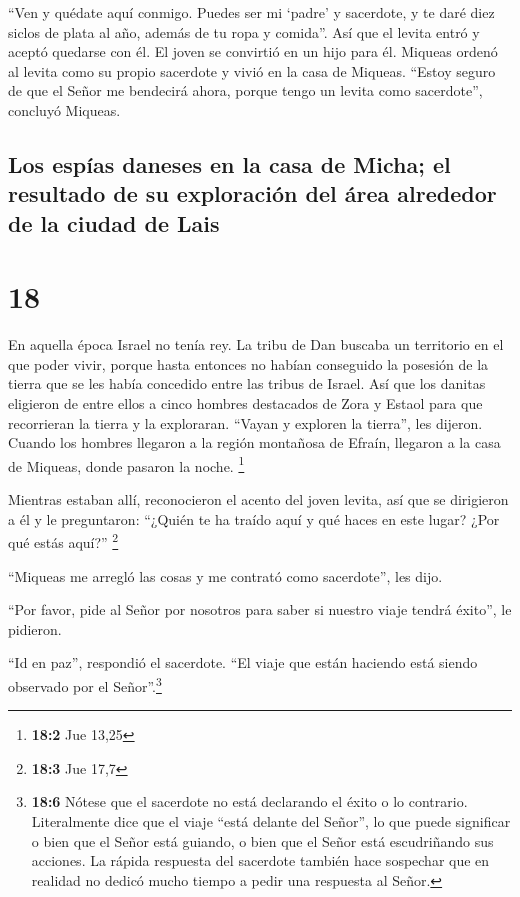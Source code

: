  ``Ven y quédate aquí conmigo. Puedes ser mi `padre' y
sacerdote, y te daré diez siclos de plata al año, además de tu ropa y
comida''. Así que el levita entró  y aceptó quedarse con
él. El joven se convirtió en un hijo para él.  Miqueas
ordenó al levita como su propio sacerdote y vivió en la casa de Miqueas.
 ``Estoy seguro de que el Señor me bendecirá ahora,
porque tengo un levita como sacerdote'', concluyó Miqueas.

\hypertarget{los-espuxedas-daneses-en-la-casa-de-micha-el-resultado-de-su-exploraciuxf3n-del-uxe1rea-alrededor-de-la-ciudad-de-lais}{%
\subsection{Los espías daneses en la casa de Micha; el resultado de su
exploración del área alrededor de la ciudad de
Lais}\label{los-espuxedas-daneses-en-la-casa-de-micha-el-resultado-de-su-exploraciuxf3n-del-uxe1rea-alrededor-de-la-ciudad-de-lais}}

\hypertarget{section-17}{%
\section{18}\label{section-17}}

 En aquella época Israel no tenía rey. La tribu de Dan
buscaba un territorio en el que poder vivir, porque hasta entonces no
habían conseguido la posesión de la tierra que se les había concedido
entre las tribus de Israel.  Así que los danitas eligieron
de entre ellos a cinco hombres destacados de Zora y Estaol para que
recorrieran la tierra y la exploraran. ``Vayan y exploren la tierra'',
les dijeron. Cuando los hombres llegaron a la región montañosa de
Efraín, llegaron a la casa de Miqueas, donde pasaron la noche.
\footnote{\textbf{18:2} Jue 13,25}

 Mientras estaban allí, reconocieron el acento del joven
levita, así que se dirigieron a él y le preguntaron: ``¿Quién te ha
traído aquí y qué haces en este lugar? ¿Por qué estás aquí?''
\footnote{\textbf{18:3} Jue 17,7}

 ``Miqueas me arregló las cosas y me contrató como
sacerdote'', les dijo.

 ``Por favor, pide al Señor por nosotros para saber si
nuestro viaje tendrá éxito'', le pidieron.

 ``Id en paz'', respondió el sacerdote. ``El viaje que
están haciendo está siendo observado por el Señor''.\footnote{\textbf{18:6}
  Nótese que el sacerdote no está declarando el éxito o lo contrario.
  Literalmente dice que el viaje ``está delante del Señor'', lo que
  puede significar o bien que el Señor está guiando, o bien que el Señor
  está escudriñando sus acciones. La rápida respuesta del sacerdote
  también hace sospechar que en realidad no dedicó mucho tiempo a pedir
  una respuesta al Señor.}

